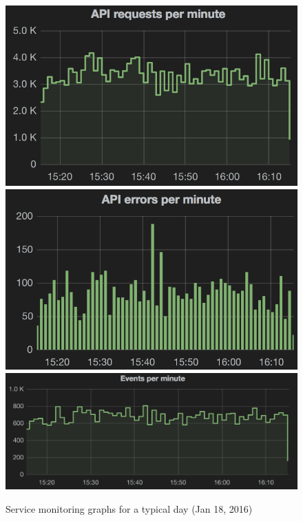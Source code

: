 \documentclass{sig-alternate}
\begin{document}
\begin{figure}
  \begin{center}
    \includegraphics[scale=0.332]{api-requests}
    \includegraphics[scale=0.332]{api-errors}
    \includegraphics[scale=0.438]{events-per-min}
  \end{center}
  \caption{Service monitoring graphs for a typical day (Jan 18, 2016)}
  \label{fig:service-stats}
\end{figure}
\end{document}
